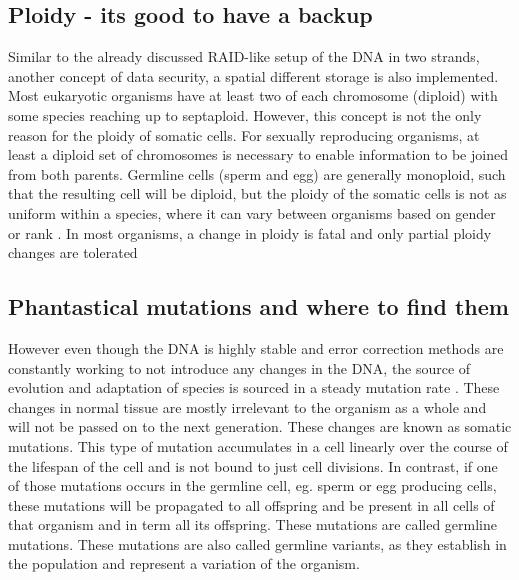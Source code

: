 \subsection[Ploidy]{Ploidy - its good to have a backup}
\label{intro-sec:ploidy}
Similar to the already discussed RAID-like setup of the DNA in two strands, another concept of data security, a spatial different storage is also implemented. Most eukaryotic organisms have at least two of each chromosome (diploid) with some species reaching up to septaploid\cite{Tateoka1975}. However, this concept is not the only reason for the ploidy of somatic cells. For sexually reproducing organisms, at least a diploid set of chromosomes is necessary to enable information to be joined from both parents. Germline cells (sperm and egg) are generally monoploid, such that the resulting cell will be diploid, but the ploidy of the somatic cells is not as uniform within a species, where it can vary between organisms based on gender or rank \cite{Trivers1976}. 
In most organisms, a change in ploidy is fatal \cite{Otto2007} and only partial ploidy changes are tolerated\cite{Gottlieb1962,Hulten2008,Cereda2012}

\subsection[Mutations]{Phantastical mutations and where to find them}
\label{intro-sec:mutations}
However even though the DNA is highly stable and error correction methods are constantly working to not introduce any changes in the DNA, the source of evolution and adaptation of species is sourced in a steady mutation rate \cite{Darwin2010,Sprouffske2018}. These changes in normal tissue are mostly irrelevant to the organism as a whole and will not be passed on to the next generation. These changes are known as somatic mutations. This type of mutation accumulates in a cell linearly over the course of the lifespan of the cell and is not bound to just cell divisions\cite{Alexandrov2015,Moore2021}. 
In contrast, if one of those mutations occurs in the germline cell, eg. sperm or egg producing cells, these mutations will be propagated to all offspring and be present in all cells of that organism and in term all its offspring. These mutations are called germline mutations. These mutations are also called germline variants, as they establish in the population and represent a variation of the organism.

